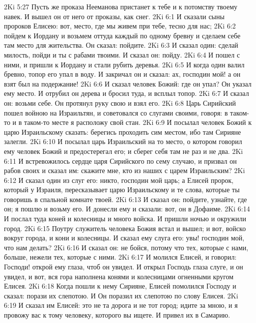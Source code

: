\vs 2Ki 5:27 Пусть же проказа Нееманова пристанет к тебе и к потомству твоему навек. И вышел он от него  от проказы, как снег.
\vs 2Ki 6:1 И сказали сыны пророков Елисею: вот, место, где мы живем при тебе, тесно для нас;
\vs 2Ki 6:2 пойдем к Иордану и возьмем оттуда каждый по одному бревну и сделаем себе там место для жительства. Он сказал: пойдите.
\vs 2Ki 6:3 И сказал один: сделай милость, пойди и ты с рабами твоими. И сказал он: пойду.
\vs 2Ki 6:4 И пошел с ними, и пришли к Иордану и стали рубить деревья.
\vs 2Ki 6:5 И когда один валил бревно, топор его упал в воду. И закричал он и сказал: ах, господин мой! а он взят был на подержание!
\vs 2Ki 6:6 И сказал человек Божий: где он упал? Он указал ему место. И отрубил он  дерева и бросил туда, и всплыл топор.
\vs 2Ki 6:7 И сказал он: возьми себе. Он протянул руку свою и взял его.
\rsbpar\vs 2Ki 6:8 Царь Сирийский пошел войною на Израильтян, и советовался со слугами своими, говоря: в таком-то и в таком-то месте я расположу свой стан.
\vs 2Ki 6:9 И посылал человек Божий к царю Израильскому сказать: берегись проходить сим местом, ибо там Сирияне залегли.
\vs 2Ki 6:10 И посылал царь Израильский на то место, о котором говорил ему человек Божий и предостерегал его; и сберег себя там не раз и не два.
\vs 2Ki 6:11 И встревожилось сердце царя Сирийского по сему случаю, и призвал он рабов своих и сказал им: скажите мне, кто из наших  с царем Израильским?
\vs 2Ki 6:12 И сказал один из слуг его: никто, господин мой царь; а Елисей пророк, который у Израиля, пересказывает царю Израильскому и те слова, которые ты говоришь в спальной комнате твоей.
\vs 2Ki 6:13 И сказал он: пойдите, узнайте, где он; я пошлю и возьму его. И донесли ему и сказали: вот, он в Дофаиме.
\vs 2Ki 6:14 И послал туда коней и колесницы и много войска. И пришли ночью и окружили город.
\vs 2Ki 6:15 Поутру служитель человека Божия встал и вышел; и вот, войско вокруг города, и кони и колесницы. И сказал ему слуга его: увы! господин мой, что нам делать?
\vs 2Ki 6:16 И сказал он: не бойся, потому что тех, которые с нами, больше, нежели тех, которые с ними.
\vs 2Ki 6:17 И молился Елисей, и говорил: Господи! открой ему глаза, чтоб он увидел. И открыл Господь глаза слуге, и он увидел, и вот, вся гора наполнена конями и колесницами огненными кругом Елисея.
\vs 2Ki 6:18 Когда пошли к нему Сирияне, Елисей помолился Господу и сказал: порази их слепотою. И Он поразил их слепотою по слову Елисея.
\vs 2Ki 6:19 И сказал им Елисей: это не та дорога и не тот город; идите за мною, и я провожу вас к тому человеку, которого вы ищете. И привел их в Самарию.
